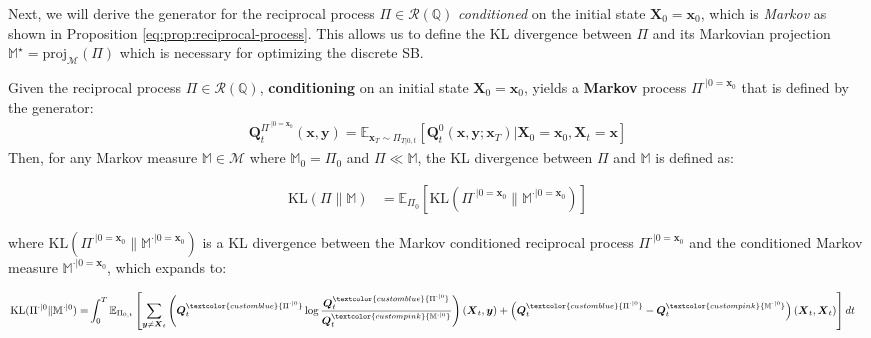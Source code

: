 \documentclass{article}
\newcommand{\bluetext}[1]{\textcolor{customblue}{#1}}
\newcommand{\pinktext}[1]{\textcolor{custompink}{#1}}
\begin{document}
Next, we will derive the generator for the reciprocal process $\Pi\in \mathcal{R}(\mathbb{Q})$ \textit{conditioned} on the initial state $\boldsymbol{X}_0=\boldsymbol{x}_0$, which is \textit{Markov} as shown in Proposition \ref{eq:prop:reciprocal-process}. This allows us to define the KL divergence between $\Pi$ and its Markovian projection $\mathbb{M}^\star=\text{proj}_{\mathcal{M}}(\Pi)$ which is necessary for optimizing the discrete SB.

\begin{lemma}\label{lemma:ctmc-cond-generator-reciprocal}
    Given the reciprocal process $\Pi\in \mathcal{R}(\mathbb{Q})$, \textbf{conditioning} on an initial state $\boldsymbol{X}_0=\boldsymbol{x}_0$, yields a \textbf{Markov} process $\Pi^{\cdot|0=\boldsymbol{x}_0}$ that is defined by the generator:
    \begin{align}
        \boldsymbol{Q}^{\Pi^{\cdot|0=\boldsymbol{x}_0}}_t(\boldsymbol{x}, \boldsymbol{y})=\mathbb{E}_{\boldsymbol{x}_T\sim \Pi_{T|0,t}}\left[\boldsymbol{Q}^0_t(\boldsymbol{x}, \boldsymbol{y};\boldsymbol{x}_T)|\boldsymbol{X}_0=\boldsymbol{x}_0, \boldsymbol{X}_t=\boldsymbol{x}\right]
    \end{align}
    Then, for any Markov measure $\mathbb{M}\in \mathcal{M}$ where $\mathbb{M}_0=\Pi_0$ and $\Pi\ll\mathbb{M}$, the KL divergence between $\Pi$ and $\mathbb{M}$ is defined as:
    \begin{small}
    \begin{align}
        \text{KL}(\Pi\|\mathbb{M})&=\mathbb{E}_{\Pi_0}\left[\text{KL}(\Pi^{\cdot|0=\boldsymbol{x}_0}\|\mathbb{M}^{\cdot|0=\boldsymbol{x}_0})\right]
    \end{align}
    \end{small}
    where $\text{KL}(\Pi^{\cdot|0=\boldsymbol{x}_0}\|\mathbb{M}^{\cdot|0=\boldsymbol{x}_0})$ is a KL divergence between the Markov conditioned reciprocal process $\Pi^{\cdot|0=\boldsymbol{x}_0}$ and the conditioned Markov measure $\mathbb{M}^{\cdot|0=\boldsymbol{x}_0}$, which expands to:
    \begin{small}
    \begin{align}
       \text{KL}(\Pi^{\cdot|0}\|\mathbb{M}^{\cdot|0})= &\int_0^T\mathbb{E}_{\Pi_{0,t}}\left[\sum_{\boldsymbol{y}\neq \boldsymbol{X}_t}\left(\boldsymbol{Q}^{\bluetext{\Pi^{\cdot|0}}}_t\log \frac{\boldsymbol{Q}^{\bluetext{\Pi^{\cdot|0}}}_{t}}{\boldsymbol{Q}^{\pinktext{\mathbb{M}^{\cdot|0}}}_{t}}\right)(\boldsymbol{X}_t, \boldsymbol{y})+\left(\boldsymbol{Q}^{\bluetext{\Pi^{\cdot|0}}}_t-\boldsymbol{Q}^{\pinktext{\mathbb{M}^{\cdot|0}}}_t\right)(\boldsymbol{X}_t,\boldsymbol{X}_t)\right]dt\label{eq:reciprocal-generator-3}
    \end{align}
    \end{small}
\end{lemma}
\end{document}
